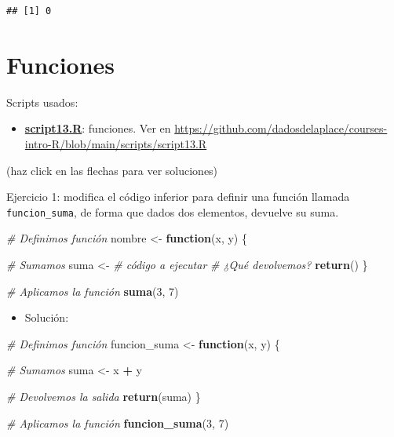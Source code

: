 \documentclass[11pt,]{book}
\newenvironment{Shaded}{\begin{snugshade}}{\end{snugshade}}
\newcommand{\CommentTok}[1]{\textcolor[rgb]{0.37,0.37,0.37}{\textit{#1}}}
\newcommand{\ControlFlowTok}[1]{\textcolor[rgb]{0.27,0.27,0.27}{\textbf{#1}}}
\newcommand{\DecValTok}[1]{\textcolor[rgb]{0.06,0.06,0.06}{#1}}
\newcommand{\KeywordTok}[1]{\textcolor[rgb]{0.27,0.27,0.27}{\textbf{#1}}}
\newcommand{\NormalTok}[1]{#1}
\newcommand{\OperatorTok}[1]{\textcolor[rgb]{0.43,0.43,0.43}{\textbf{#1}}}
\newcommand{\StringTok}[1]{\textcolor[rgb]{0.5,0.5,0.5}{#1}}
\providecommand{\tightlist}{%
  \setlength{\itemsep}{0pt}\setlength{\parskip}{0pt}}
\begin{document}
\begin{verbatim}
## [1] 0
\end{verbatim}

\hypertarget{funciones}{%
\section{Funciones}\label{funciones}}

\begin{blackbox}

Scripts usados:

\begin{itemize}
\tightlist
\item
  \href{https://github.com/dadosdelaplace/courses-intro-R/blob/main/scripts/script13.R}{\textbf{script13.R}}: funciones. Ver en \url{https://github.com/dadosdelaplace/courses-intro-R/blob/main/scripts/script13.R}
\end{itemize}


\end{blackbox}

(haz click en las flechas para ver soluciones)

Ejercicio 1: modifica el código inferior para definir una función llamada \texttt{funcion\_suma}, de forma que dados dos elementos, devuelve su suma.

\begin{Shaded}
\begin{Highlighting}[]
\CommentTok{# Definimos función}
\NormalTok{nombre <-}\StringTok{ }\ControlFlowTok{function}\NormalTok{(x, y) \{}
  
  \CommentTok{# Sumamos}
\NormalTok{  suma <-}\StringTok{ }\CommentTok{# código a ejecutar}
\StringTok{  }
\StringTok{  }\CommentTok{# ¿Qué devolvemos?}
\StringTok{  }\KeywordTok{return}\NormalTok{()}
\NormalTok{\}}

\CommentTok{# Aplicamos la función}
\KeywordTok{suma}\NormalTok{(}\DecValTok{3}\NormalTok{, }\DecValTok{7}\NormalTok{)}
\end{Highlighting}
\end{Shaded}

\begin{itemize}
\tightlist
\item
  Solución:
\end{itemize}

\begin{Shaded}
\begin{Highlighting}[]
\CommentTok{# Definimos función}
\NormalTok{funcion_suma <-}\StringTok{ }\ControlFlowTok{function}\NormalTok{(x, y) \{}
  
  \CommentTok{# Sumamos}
\NormalTok{  suma <-}\StringTok{ }\NormalTok{x }\OperatorTok{+}\StringTok{ }\NormalTok{y}
  
  \CommentTok{# Devolvemos la salida}
  \KeywordTok{return}\NormalTok{(suma)}
\NormalTok{\}}

\CommentTok{# Aplicamos la función}
\KeywordTok{funcion_suma}\NormalTok{(}\DecValTok{3}\NormalTok{, }\DecValTok{7}\NormalTok{)}
\end{Highlighting}
\end{Shaded}
\end{document}
